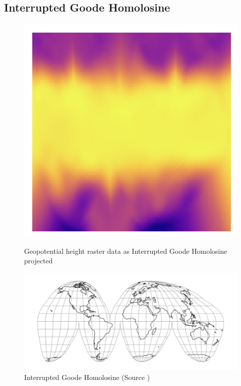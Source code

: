 \subsection{Interrupted Goode Homolosine}
\begin{figure}[h]
    \centering
    \begin{minipage}{0.30\textwidth}
        \centering
        \includegraphics[width=0.9\linewidth]{figures/chapter-8/geopoth_goode.png}
        \caption{ Geopotential height raster data as Interrupted Goode Homolosine projected}
        \label{fig:ig_geopoth_raster}
    \end{minipage}\hfill
    \begin{minipage}{0.30\textwidth}
        \centering
        \includegraphics[width=0.9\linewidth]{figures/chapter-8/igh.png}
        \caption{Interrupted Goode Homolosine (Source \cite{PROJ_SITE})}
        \label{fig:ig_proj}
    \end{minipage}\hfill

\end{figure}
